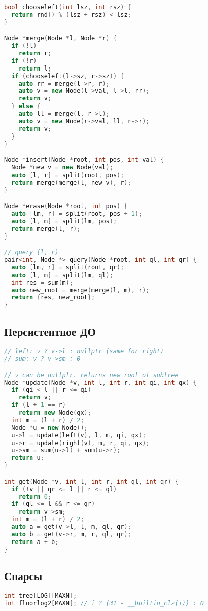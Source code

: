 \documentclass[9pt,a4paper,landscape,twosided]{extarticle}
\begin{document}
\begin{multicols*}{3}
\begin{lstlisting}[language=C++]
bool chooseleft(int lsz, int rsz) {
  return rnd() % (lsz + rsz) < lsz;
}

Node *merge(Node *l, Node *r) {
  if (!l)
    return r;
  if (!r)
    return l;
  if (chooseleft(l->sz, r->sz)) {
    auto rr = merge(l->r, r);
    auto v = new Node(l->val, l->l, rr);
    return v;
  } else {
    auto ll = merge(l, r->l);
    auto v = new Node(r->val, ll, r->r);
    return v;
  }
}

Node *insert(Node *root, int pos, int val) {
  Node *new_v = new Node(val);
  auto [l, r] = split(root, pos);
  return merge(merge(l, new_v), r);
}

Node *erase(Node *root, int pos) {
  auto [lm, r] = split(root, pos + 1);
  auto [l, m] = split(lm, pos);
  return merge(l, r);
}

// query [l, r)
pair<int, Node *> query(Node *root, int ql, int qr) {
  auto [lm, r] = split(root, qr);
  auto [l, m] = split(lm, ql);
  int res = sum(m);
  auto new_root = merge(merge(l, m), r);
  return {res, new_root};
}

\end{lstlisting}

\subsection{Персистентное ДО}
\begin{lstlisting}[language=C++]
// left: v ? v->l : nullptr (same for right)
// sum: v ? v->sm : 0

// v can be nullptr. returns new root of subtree
Node *update(Node *v, int l, int r, int qi, int qx) {
  if (qi < l || r <= qi)
    return v;
  if (l + 1 == r)
    return new Node(qx);
  int m = (l + r) / 2;
  Node *u = new Node();
  u->l = update(left(v), l, m, qi, qx);
  u->r = update(right(v), m, r, qi, qx);
  u->sm = sum(u->l) + sum(u->r);
  return u;
}

int get(Node *v, int l, int r, int ql, int qr) {
  if (!v || qr <= l || r <= ql)
    return 0;
  if (ql <= l && r <= qr)
    return v->sm;
  int m = (l + r) / 2;
  auto a = get(v->l, l, m, ql, qr);
  auto b = get(v->r, m, r, ql, qr);
  return a + b;
}

\end{lstlisting}

\subsection{Спарсы}
\begin{lstlisting}[language=C++]
int tree[LOG][MAXN];
int floorlog2[MAXN]; // i ? (31 - __builtin_clz(i)) : 0


\end{lstlisting}
\end{multicols*}
\end{document}
